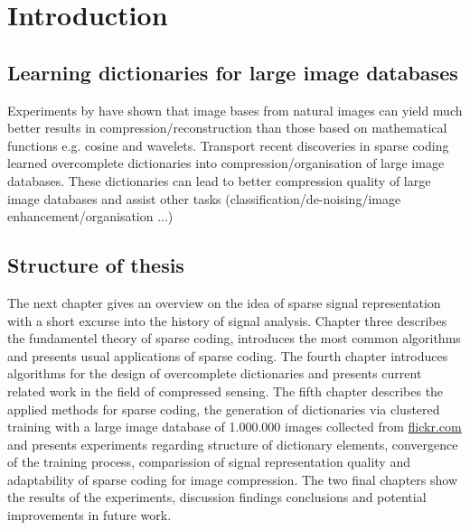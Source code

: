 \chapter{Introduction}
\label{sec:introduction}
\section{Learning dictionaries for large image databases}



Experiments by \cite{} have shown \cite{} that image bases from natural
images can yield much better results in compression/reconstruction than
those based on mathematical functions e.g. cosine and wavelets.\cite{Mairal2010}
Transport recent discoveries in sparse coding learned overcomplete
dictionaries into compression/organisation of large image databases.
These dictionaries can lead to better compression quality of large
image databases and assist other tasks (classification/de-noising/image
enhancement/organisation ...)


\section{Structure of thesis}
The next chapter gives an overview on the idea of sparse signal
representation with a short excurse into the history of signal analysis. Chapter
three describes the fundamentel theory of sparse coding, introduces the most
common algorithms and presents usual applications of sparse coding. The fourth
chapter introduces algorithms for the design of overcomplete dictionaries and
presents current related work in the field of compressed sensing. The fifth
chapter describes the applied methods for sparse coding, the generation of
dictionaries via clustered training with a large image database of 1.000.000
images collected from \url{flickr.com} and presents experiments regarding
structure of dictionary elements, convergence of the training process,
comparission of signal representation quality and adaptability of sparse coding
for image compression. The two final chapters show the results of the
experiments, discussion findings conclusions and potential improvements in
future work. 

